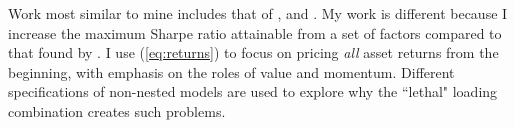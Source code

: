 Work most similar to mine includes that of \textcite{fama2016choosing}, 
\textcite{ball2016accruals} and \textcite{barillas2015comparing}.
My work is different because I increase the maximum Sharpe ratio attainable 
from a set of factors compared to that found by \textcite{fama2016choosing}.
I use (\ref{eq:returns}) to focus on pricing \emph{all} asset returns from the 
beginning, with emphasis on the roles of value and momentum.
Different specifications of non-nested models are used to explore why the 
``lethal" loading combination creates such problems.
